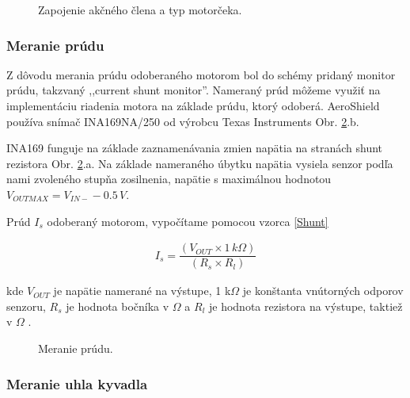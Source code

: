\begin{figure}[!tbh]
	\hfill
	\hfill
	\hfill
	\caption{Zapojenie akčného člena a typ motorčeka.}\label{OBRAZOK 2.3}
\end{figure}


\subsubsection{Meranie prúdu}
\label{merprud}

Z dôvodu merania prúdu odoberaného motorom bol do schémy pridaný monitor prúdu, takzvaný ,,current shunt monitor''. Nameraný prúd môžeme využiť na implementáciu riadenia motora na základe prúdu, ktorý odoberá. AeroShield používa snímač INA169NA/250 od výrobcu Texas Instruments Obr. \ref{OBRAZOK 2.3.2}.b.

INA169 funguje na základe zaznamenávania zmien napätia na stranách shunt rezistora Obr. \ref{OBRAZOK 2.3.2}.a. Na základe nameraného úbytku napätia vysiela senzor podľa nami zvoleného stupňa zosilnenia, napätie s maximálnou hodnotou $V_{OUTMAX} = V_{IN-} - 0.5\,V $.

Prúd $I_{s}$ odoberaný motorom, vypočítame pomocou vzorca \ref{Shunt}

\begin{align}
	\label{Shunt}
 I_{s} = \dfrac{(V_{OUT} \times  1\,k\Omega)}{(R_{s} \times R_{l})}
\end{align}

kde $V_{OUT}$ je napätie namerané na výstupe, 1 k$\Omega$ je konštanta vnútorných odporov senzoru, $R_{s}$ je hodnota bočníka v $\Omega$ a $R_{l}$ je hodnota rezistora na výstupe, taktiež v $\Omega$ \cite{INA}.

\begin{figure}[!tbh]
	\hfill
	\hfill
	\hfill
	\caption{Meranie prúdu.}\label{OBRAZOK 2.3.2}
\end{figure}


\subsubsection{Meranie uhla kyvadla}
\label{meruhl}

